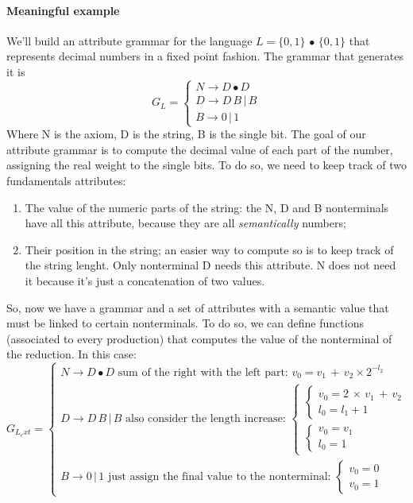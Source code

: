 			\paragraph{Meaningful example}
				We'll build an attribute grammar for the language $L = \{0, 1\} \,\bullet\, \{0, 1\}$ that represents decimal numbers in a fixed point fashion. The grammar that generates it is
				\begin{equation}
					G_L = 
					\begin{cases}
						N \rightarrow D \bullet D \\
						D \rightarrow D \, B \, \vert \, B \\
						B \rightarrow 0 \, \vert \, 1
					\end{cases}
				\end{equation}
				Where N is the axiom, D is the string, B is the single bit. The goal of our attribute grammar is to compute the decimal value of each part of the number, assigning the real weight to the single bits. To do so, we need to keep track of two fundamentals attributes:
				\begin{enumerate}
					\item The value of the numeric parts of the string: the N, D and B nonterminals have all this attribute, because they are all \emph{semantically} numbers;
					\item Their position in the string; an easier way to compute so is to keep track of the string lenght. Only nonterminal D needs this attribute. N does not need it because it's just a concatenation of two values. 
				\end{enumerate}
				So, now we have a grammar and a set of attributes with a semantic value that must be linked to certain nonterminals. To do so, we can define functions (associated to every production) that computes the value of the nonterminal of the reduction. In this case:
				\begin{equation}
					G_{L_ext} = 
					\begin{cases}
						N \rightarrow D \bullet D \text{ sum of the right with the left part: } v_0 = v_1\,+\,v_2\times 2^{-l_2} \\
						D \rightarrow D \, B \, \vert \, B \text{ also consider the length increase: } 
							\begin{cases}
								\begin{cases}
									v_0 = 2 \,\times\, v_1\,+\,v_2 \\
									l_0 = l_1 + 1
								\end{cases}\\
								\begin{cases}
									v_0 = v_1 \\
									l_0 = 1
								\end{cases}
							\end{cases}\\
						B \rightarrow 0 \, \vert \, 1 \text{ just assign the final value to the nonterminal: } 
							\begin{cases}
								v_0 = 0\\
								v_0 = 1
							\end{cases}
					\end{cases}
				\end{equation}
